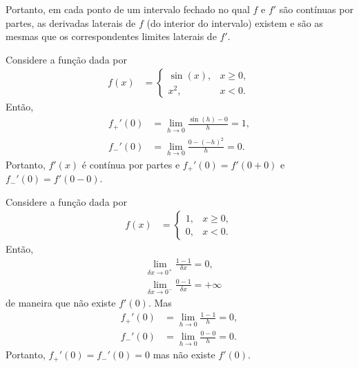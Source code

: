Portanto, em cada ponto de um intervalo fechado no qual $f$ e $f'$ s\~{a}o cont\'{i}nuas por partes, as derivadas laterais de $f$ (do interior do intervalo) existem e s\~{a}o as mesmas que os correspondentes limites laterais de $f'$.
\begin{exem}
    Considere a fun\c{c}\~{a}o dada por
    \begin{align*}
        f(x) &= \begin{cases}
            \sin(x), & x \geq 0, \\
            x^2, & x < 0.
        \end{cases}
    \end{align*}
    Ent\~{a}o,
    \begin{align*}
        f_+'(0) &= \lim_{h \to 0} \frac{\sin\left( h \right) - 0}{h} = 1, \\
        f_-'(0) &= \lim_{h \to 0} \frac{0 - \left( -h \right)^2}{h} = 0.
    \end{align*}
    Portanto, $f'(x)$ \'{e} cont\'{i}nua por partes e $f_+'(0) = f'(0 + 0)$ e $f_-'(0) = f'(0 - 0)$.
\end{exem}
\begin{exem}
    Considere a fun\c{c}\~{a}o dada por
    \begin{align*}
        f(x) &= \begin{cases}
            1, & x \geq 0, \\
            0, & x < 0.
        \end{cases}
    \end{align*}
    Ent\~{a}o,
    \begin{align*}
        & \lim_{\delta x \to 0^+} \frac{1 - 1}{\delta x} = 0, \\
        & \lim_{\delta x \to 0^-} \frac{0 - 1}{\delta x} = +\infty
    \end{align*}
    de maneira que n\~{a}o existe $f'(0)$. Mas
    \begin{align*}
        f_+'(0) &= \lim_{h \to 0} \frac{1 - 1}{h} = 0, \\
        f_-'(0) &= \lim_{h \to 0} \frac{0 - 0}{h} = 0.
    \end{align*}
    Portanto, $f_+'(0) = f_-'(0) = 0$ mas n\~{a}o existe $f'(0)$.
\end{exem}
